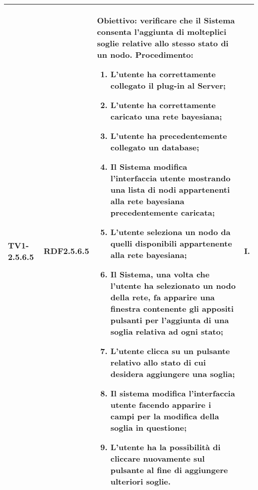 \begin{longtable}{|C{.15\textwidth}|C{.13\textwidth}|m{.52\textwidth}|C{.08\textwidth}|}
TV1-2.5.6.5 & RDF2.5.6.5  &
	\textbf{Obiettivo}: verificare che il Sistema consenta l'aggiunta di molteplici soglie relative allo stesso stato di un nodo. \newline
	\textbf{Procedimento}:
	\begin{enumerate}
		\item L'utente ha correttamente collegato il plug-in al Server;
		\item L'utente ha correttamente caricato una rete bayesiana;
		\item L'utente ha precedentemente collegato un database;
		\item Il Sistema modifica l'interfaccia utente mostrando una lista di nodi appartenenti alla rete bayesiana precedentemente caricata;
		\item L'utente seleziona un nodo da quelli disponibili appartenente alla rete bayesiana;
		\item Il Sistema, una volta che l'utente ha selezionato un nodo della rete, fa apparire una finestra contenente gli appositi pulsanti per l'aggiunta di una soglia relativa ad ogni stato;
		\item L'utente clicca su un pulsante relativo allo stato di cui desidera aggiungere una soglia;
		\item Il sistema modifica l'interfaccia utente facendo apparire i campi per la modifica della soglia in questione;
		\item L'utente ha la possibilità di cliccare nuovamente sul pulsante al fine di aggiungere ulteriori soglie.
	\end{enumerate}
	& I. \\
\hline


\end{longtable}
